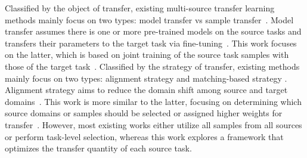 Classified by the object of transfer, existing multi-source transfer learning methods mainly focus on two types: model transfer vs sample transfer~\cite{zhuang2020comprehensive}. Model transfer assumes there is one or more pre-trained models on the source tasks and transfers their parameters to the target task via fine-tuning~\cite{wan2022uav}.  This work focuses on the latter, which is based on joint training of the source task samples with those of the target task~\cite{zhang2024revisiting_MADA,shui2021aggregating_WADN,li2021dynamic}. %
Classified by the strategy of transfer, existing methods mainly focus on two types: alignment strategy and matching-based strategy \cite{zhao2024more}. Alignment strategy aims to reduce the domain shift among source and target domains~\cite{li2021multi,zhao2021madan,li2021dynamic}. This work is more similar to the latter, focusing on determining which source domains or samples should be selected or assigned higher weights for transfer~\cite{guo2020multi,shui2021aggregating_WADN,tong2021mathematical,wu2024h_Hensemble}. 
However, most existing works either utilize all samples from all sources or perform task-level selection, whereas this work explores a framework that optimizes the transfer quantity of each source task.





